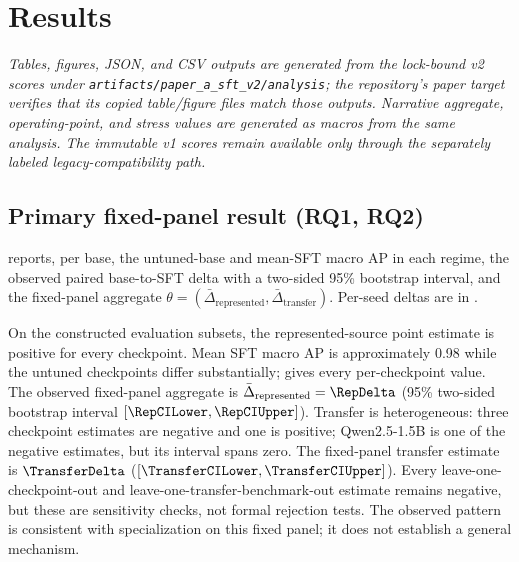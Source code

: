 \documentclass[11pt]{article}
\begin{document}
\section{Results}
\label{sec:results}

\emph{Tables, figures, JSON, and CSV outputs are generated from the lock-bound v2 scores under \texttt{artifacts/\allowbreak paper\_a\_sft\_v2/\allowbreak analysis}; the repository's paper target verifies that its copied table/figure files match those outputs. Narrative aggregate, operating-point, and stress values are generated as macros from the same analysis. The immutable v1 scores remain available only through the separately labeled legacy-compatibility path.}

\subsection{Primary fixed-panel result (RQ1, RQ2)}
\label{subsec:primary}

 reports, per base, the untuned-base and mean-SFT macro AP in each regime, the observed paired base-to-SFT delta with a two-sided 95\% bootstrap interval, and the fixed-panel aggregate $\theta = (\bar\Delta_{\text{represented}}, \bar\Delta_{\text{transfer}})$. Per-seed deltas are in .

On the constructed evaluation subsets, the represented-source point estimate is positive for every checkpoint. Mean SFT macro AP is approximately 0.98 while the untuned checkpoints differ substantially;  gives every per-checkpoint value. The observed fixed-panel aggregate is $\bar\Delta_{\text{represented}}=\RepDelta$ (95\% two-sided bootstrap interval $[\RepCILower,\RepCIUpper]$). Transfer is heterogeneous: three checkpoint estimates are negative and one is positive; Qwen2.5-1.5B is one of the negative estimates, but its interval spans zero. The fixed-panel transfer estimate is $\TransferDelta$ ($[\TransferCILower,\TransferCIUpper]$). Every leave-one-checkpoint-out and leave-one-transfer-benchmark-out estimate remains negative, but these are sensitivity checks, not formal rejection tests. The observed pattern is consistent with specialization on this fixed panel; it does not establish a general mechanism.

\begin{table}[!htbp]
\centering
\small
\caption{Clean-v2 retrospective fixed-panel result. Base and mean-SFT benchmark-macro AP, with observed paired base-to-SFT deltas and two-sided 95\% hierarchical-bootstrap intervals. The last row is the observed fixed-panel aggregate $\theta$; intervals are descriptive under the locked precision-focused analysis mode and conditional fixed-panel scope.}
\label{tab:primary}
\resizebox{\textwidth}{!}{}
\end{table}
\end{document}
